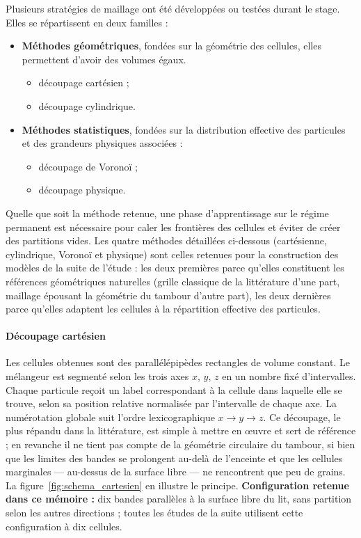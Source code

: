 \documentclass[french]{MemoireMaster}
\begin{document}
Plusieurs stratégies de maillage ont été développées ou testées durant le stage. Elles se répartissent en deux familles :

\begin{itemize}[itemsep=3pt]
  \item \textbf{Méthodes géométriques}, fondées sur la géométrie des cellules, elles permettent d'avoir des volumes égaux.

    \begin{itemize}
      \item découpage cartésien ;
      \item découpage cylindrique.
    \end{itemize}
  \item \textbf{Méthodes statistiques}, fondées sur la distribution effective des particules et des grandeurs physiques associées :
    \begin{itemize}
      \item découpage de Voronoï ;
      \item découpage physique.
    \end{itemize}
\end{itemize}

Quelle que soit la méthode retenue, une phase d'apprentissage sur le régime permanent est nécessaire pour caler les frontières des cellules et éviter de créer des partitions vides. Les quatre méthodes détaillées ci-dessous (cartésienne, cylindrique, Voronoï et physique) sont celles retenues pour la construction des modèles de la suite de l'étude : les deux premières parce qu'elles constituent les références géométriques naturelles (grille classique de la littérature d'une part, maillage épousant la géométrie du tambour d'autre part), les deux dernières parce qu'elles adaptent les cellules à la répartition effective des particules.


\paragraph{Découpage cartésien}
Les cellules obtenues sont des parallélépipèdes rectangles de volume constant.
Le mélangeur est segmenté selon les trois axes $x$, $y$, $z$ en un nombre fixé d'intervalles. Chaque particule reçoit un label correspondant à la cellule dans laquelle elle se trouve, selon sa position relative normalisée par l'intervalle de chaque axe. La numérotation globale suit l'ordre lexicographique $x \to y \to z$. Ce découpage, le plus répandu dans la littérature, est simple à mettre en œuvre et sert de référence ; en revanche il ne tient pas compte de la géométrie circulaire du tambour, si bien que les limites des bandes se prolongent au-delà de l'enceinte et que les cellules marginales --- au-dessus de la surface libre --- ne rencontrent que peu de grains. La figure~\ref{fig:schema_cartesien} en illustre le principe. \textbf{Configuration retenue dans ce mémoire :} dix bandes parallèles à la surface libre du lit, sans partition selon les autres directions ; toutes les études de la suite utilisent cette configuration à dix cellules.
\end{document}

